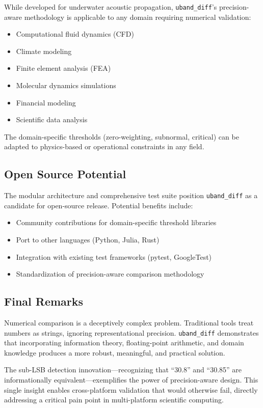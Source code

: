 \documentclass[11pt,letterpaper]{article}
\newcommand{\ubdiff}{\texttt{uband\_diff}}
\begin{document}
While developed for underwater acoustic propagation, \ubdiff{}'s precision-aware methodology is applicable to any domain requiring numerical validation:

\begin{itemize}
    \item Computational fluid dynamics (CFD)
    \item Climate modeling
    \item Finite element analysis (FEA)
    \item Molecular dynamics simulations
    \item Financial modeling
    \item Scientific data analysis
\end{itemize}

The domain-specific thresholds (zero-weighting, subnormal, critical) can be adapted to physics-based or operational constraints in any field.

\subsection{Open Source Potential}

The modular architecture and comprehensive test suite position \ubdiff{} as a candidate for open-source release. Potential benefits include:

\begin{itemize}
    \item Community contributions for domain-specific threshold libraries
    \item Port to other languages (Python, Julia, Rust)
    \item Integration with existing test frameworks (pytest, GoogleTest)
    \item Standardization of precision-aware comparison methodology
\end{itemize}

\subsection{Final Remarks}

Numerical comparison is a deceptively complex problem. Traditional tools treat numbers as strings, ignoring representational precision. \ubdiff{} demonstrates that incorporating information theory, floating-point arithmetic, and domain knowledge produces a more robust, meaningful, and practical solution.

The sub-LSB detection innovation---recognizing that ``30.8'' and ``30.85'' are informationally equivalent---exemplifies the power of precision-aware design. This single insight enables cross-platform validation that would otherwise fail, directly addressing a critical pain point in multi-platform scientific computing.
\end{document}
